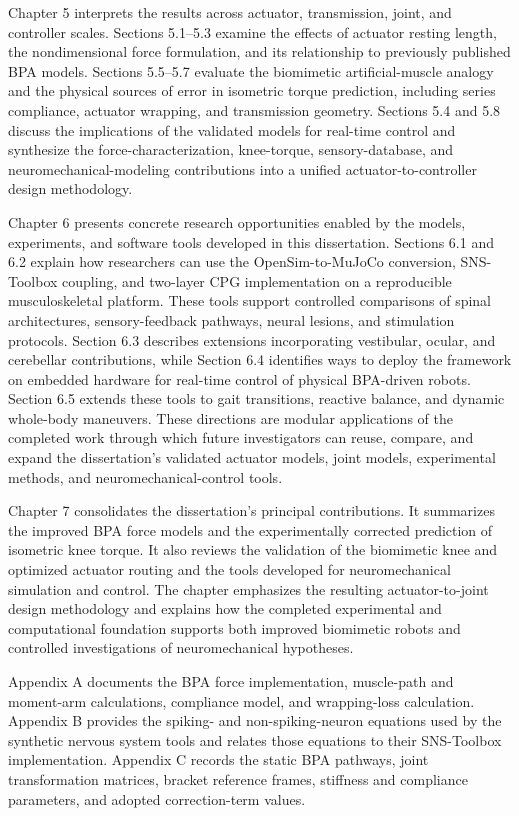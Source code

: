 Chapter 5 interprets the results across actuator, transmission, joint, and controller scales. Sections 5.1--5.3 examine the effects of actuator resting length, the nondimensional force formulation, and its relationship to previously published BPA models. Sections 5.5--5.7 evaluate the biomimetic artificial-muscle analogy and the physical sources of error in isometric torque prediction, including series compliance, actuator wrapping, and transmission geometry. Sections 5.4 and 5.8 discuss the implications of the validated models for real-time control and synthesize the force-characterization, knee-torque, sensory-database, and neuromechanical-modeling contributions into a unified actuator-to-controller design methodology.

Chapter 6 presents concrete research opportunities enabled by the models, experiments, and software tools developed in this dissertation. Sections 6.1 and 6.2 explain how researchers can use the OpenSim-to-MuJoCo conversion, SNS-Toolbox coupling, and two-layer CPG implementation on a reproducible musculoskeletal platform. These tools support controlled comparisons of spinal architectures, sensory-feedback pathways, neural lesions, and stimulation protocols. Section 6.3 describes extensions incorporating vestibular, ocular, and cerebellar contributions, while Section 6.4 identifies ways to deploy the framework on embedded hardware for real-time control of physical BPA-driven robots. Section 6.5 extends these tools to gait transitions, reactive balance, and dynamic whole-body maneuvers. These directions are modular applications of the completed work through which future investigators can reuse, compare, and expand the dissertation's validated actuator models, joint models, experimental methods, and neuromechanical-control tools.

Chapter 7 consolidates the dissertation's principal contributions. It summarizes the improved BPA force models and the experimentally corrected prediction of isometric knee torque. It also reviews the validation of the biomimetic knee and optimized actuator routing and the tools developed for neuromechanical simulation and control. The chapter emphasizes the resulting actuator-to-joint design methodology and explains how the completed experimental and computational foundation supports both improved biomimetic robots and controlled investigations of neuromechanical hypotheses.

Appendix A documents the BPA force implementation, muscle-path and moment-arm calculations, compliance model, and wrapping-loss calculation. Appendix B provides the spiking- and non-spiking-neuron equations used by the synthetic nervous system tools and relates those equations to their SNS-Toolbox implementation. Appendix C records the static BPA pathways, joint transformation matrices, bracket reference frames, stiffness and compliance parameters, and adopted correction-term values.
